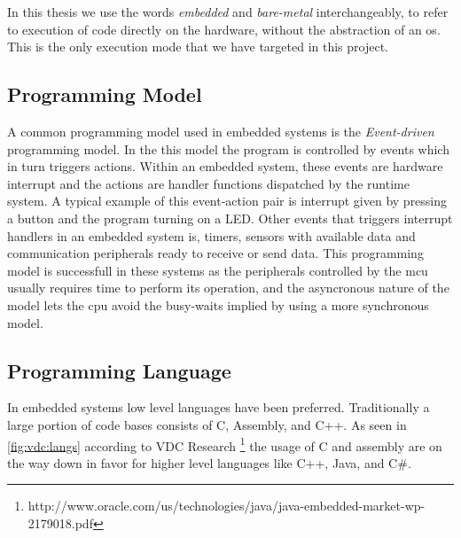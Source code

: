 In this thesis we use the words \emph{embedded} and \emph{bare-metal} interchangeably, to refer to execution of code directly on the hardware, without the abstraction of an \gls{os}.
This is the only execution mode that we have targeted in this project.

\subsection{Programming Model}
A common programming model used in embedded systems is the \emph{Event-driven} programming model.
In the this model the program is controlled by events which in turn triggers actions.
Within an embedded system, these events are hardware interrupt and the actions are handler functions dispatched by the runtime system.
A typical example of this event-action pair is interrupt given by pressing a button and the program turning on a \gls{LED}.
Other events that triggers interrupt handlers in an embedded system is, timers, sensors with available data and communication peripherals ready to receive or send data.
This programming model is successfull in these systems as the peripherals controlled by the \gls{mcu} usually requires time to perform its operation, and the asyncronous nature of the model lets the \gls{cpu} avoid the busy-waits implied by using a more synchronous model.

\subsection{Programming Language}

In embedded systems low level languages have been preferred.
Traditionally a large portion of code bases consists of C, Assembly, and C++.
As seen in \autoref{fig:vdc:langs} according to VDC Research \footnote{http://www.oracle.com/us/technologies/java/java-embedded-market-wp-2179018.pdf} the usage of C and assembly are on the way down in favor for higher level languages like C++, Java, and C\#.

